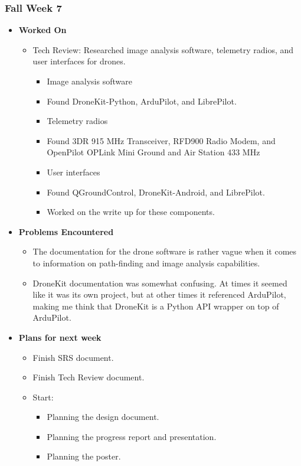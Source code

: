 \documentclass[compsoc,draftclsnofoot,onecolumn,10pt]{IEEEtran}
\begin{document}
\subsubsection{Fall Week 7}
\begin{itemize}
    \item {\textbf{Worked On}}
    \begin{itemize}
        \item Tech Review: Researched image analysis software, telemetry radios, and user interfaces for drones.
        \begin{itemize}
            \item Image analysis software
            \item Found DroneKit-Python, ArduPilot, and LibrePilot.
            \item Telemetry radios
            \item Found 3DR 915 MHz Transceiver, RFD900 Radio Modem, and OpenPilot OPLink Mini Ground and Air Station 433 MHz
            \item User interfaces
            \item Found QGroundControl, DroneKit-Android, and LibrePilot.
            \item Worked on the write up for these components.
        \end{itemize}
    \end{itemize}

    \item {\textbf{Problems Encountered}}
    \begin{itemize}
        \item The documentation for the drone software is rather vague when it comes to information on path-finding and image analysis capabilities.
        \item DroneKit documentation was somewhat confusing. At times it seemed like it was its own project, but at other times it referenced ArduPilot, making me think that DroneKit is a Python API wrapper on top of ArduPilot.
    \end{itemize}

    \item{\textbf{Plans for next week}}
    \begin{itemize}
    \item Finish SRS document.
    \item Finish Tech Review document.
    \item Start:
    \begin{itemize}
        \item Planning the design document.
        \item Planning the progress report and presentation.
        \item Planning the poster.
    \end{itemize}
    \end{itemize}
\end{itemize}
\end{document}
